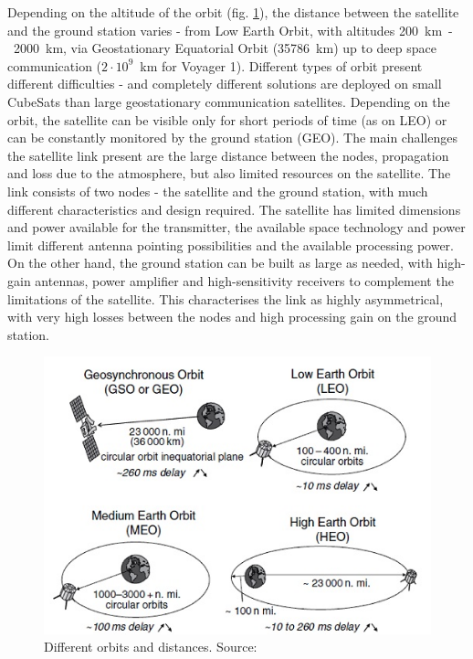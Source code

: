 Depending on the altitude of the orbit (fig. \ref{intro:orbits}), the distance between the satellite and the ground station varies - from Low Earth Orbit, with altitudes \SI{200}{\kilo\meter}~-~\SI{2000}{\kilo\meter}, via Geostationary Equatorial Orbit (\SI{35786}{\kilo\meter}) up to deep space communication ($2\cdot 10^{9}$~km for Voyager 1). Different types of orbit present different difficulties - and completely different solutions are deployed on small CubeSats than large geostationary communication satellites. Depending on the orbit, the satellite can be visible only for short periods of time (as on LEO) or can be constantly monitored by the ground station (GEO). The main challenges the satellite link present are the large distance between the nodes, propagation and loss due to the atmosphere, but also limited resources on the satellite. The link consists of two nodes - the satellite and the ground station, with much different characteristics and design required. The satellite has limited dimensions and power available for the transmitter, the available space technology and power limit different antenna pointing possibilities and the available processing power. On the other hand, the ground station can be built as large as needed, with high-gain antennas, power amplifier and high-sensitivity receivers to complement the limitations of the satellite. This characterises the link as highly asymmetrical, with very high losses between the nodes and high processing gain on the ground station.
\begin{figure}
    \centering
    \includegraphics[width=0.5\paperwidth]{img/2/orbit_types.jpg}
    \caption{Different orbits and distances. Source: \cite{satcom_decription}}
    \label{intro:orbits}
\end{figure}


